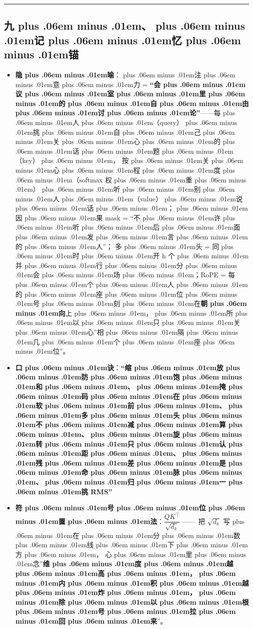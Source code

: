 \documentclass[
]{article}
\providecommand{\tightlist}{%
  \setlength{\itemsep}{0pt}\setlength{\parskip}{0pt}}
\def\zh#1{{\zhfont #1}}
\def\zhglue{\hskip0pt plus .06em minus .01em}
\begin{document}
\begin{center}\rule{0.5\linewidth}{0.5pt}\end{center}

\subsection{\zh{九\zhglue 、\zhglue 记\zhglue 忆\zhglue 锚}}\label{ux4e5dux8bb0ux5fc6ux951a}

\begin{itemize}
\tightlist
\item
  \textbf{\zh{隐\zhglue 喻}}\zh{：\zhglue 注\zhglue 意\zhglue 力} = \textbf{``\zh{会\zhglue 议\zhglue 室\zhglue 里\zhglue 的\zhglue 自\zhglue 由\zhglue 讨\zhglue 论}''}------\zh{每\zhglue 人\zhglue （}query\zh{）\zhglue 挑\zhglue 自\zhglue 己\zhglue 关\zhglue 心\zhglue 的\zhglue 话\zhglue 题\zhglue （}key\zh{）\zhglue ，} \zh{按\zhglue 关\zhglue 心\zhglue 程\zhglue 度\zhglue （}softmax \zh{权\zhglue 重\zhglue ）\zhglue 听\zhglue 别\zhglue 人\zhglue （}value\zh{）\zhglue 说\zhglue 话\zhglue ；\zhglue 因\zhglue 果} mask = ``\zh{不\zhglue 许\zhglue 听\zhglue 后\zhglue 面\zhglue 发\zhglue 言\zhglue 的\zhglue 人}''\zh{；} \zh{多\zhglue 头} = \zh{同\zhglue 时\zhglue 开} h \zh{个\zhglue 并\zhglue 行\zhglue 分\zhglue 会\zhglue 场\zhglue ；}RoPE = \zh{每\zhglue 个\zhglue 人\zhglue 的\zhglue 座\zhglue 位\zhglue 号\zhglue 刻\zhglue 在}\textbf{\zh{朝\zhglue 向}}\zh{上\zhglue ，\zhglue 所\zhglue 以\zhglue 只\zhglue 关\zhglue 心}''\zh{相\zhglue 隔\zhglue 几\zhglue 个\zhglue 座\zhglue 位}''\zh{。}
\item
  \textbf{\zh{口\zhglue 诀}}\zh{：}\textbf{``\zh{缩\zhglue 放\zhglue 防\zhglue 饱\zhglue 和\zhglue 、\zhglue 掩\zhglue 码\zhglue 在\zhglue 软\zhglue 前\zhglue 、\zhglue 多\zhglue 头\zhglue 不\zhglue 减\zhglue 算\zhglue 、\zhglue 旋\zhglue 转\zhglue 只\zhglue 认\zhglue 距\zhglue 、\zhglue 残\zhglue 差\zhglue 是\zhglue 命\zhglue 脉\zhglue 、\zhglue 归\zhglue 一\zhglue 挑} RMS''}
\item
  \textbf{\zh{符\zhglue 号\zhglue 位\zhglue 置\zhglue 法}}\zh{：}\(\dfrac{QK^\top}{\sqrt{d_k}}\) ------ \zh{把} \(\sqrt{d_k}\) \zh{写\zhglue 在\zhglue 分\zhglue 数\zhglue 线\zhglue 下\zhglue 方\zhglue ，} \zh{心\zhglue 里\zhglue 念}''\textbf{\zh{维\zhglue 度\zhglue 越\zhglue 高\zhglue ，\zhglue 内\zhglue 积\zhglue 越\zhglue 炸\zhglue ，\zhglue 除\zhglue 以\zhglue 根\zhglue 号\zhglue 拉\zhglue 回\zhglue 来}}''\zh{。}
\end{itemize}

\newpage
\end{document}
